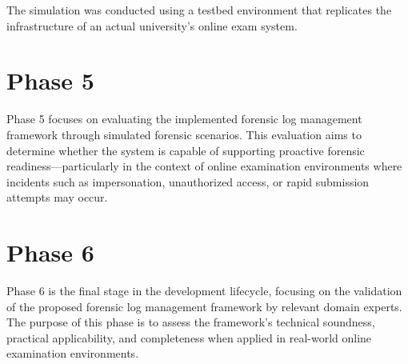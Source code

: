 The simulation was conducted using a testbed environment that replicates the infrastructure of an actual university's online exam system.
\section{Phase 5}
Phase 5 focuses on evaluating the implemented forensic log management framework through simulated forensic scenarios. This evaluation aims to determine whether the system is capable of supporting proactive forensic readiness—particularly in the context of online examination environments where incidents such as impersonation, unauthorized access, or rapid submission attempts may occur.

\section{Phase 6}
Phase 6 is the final stage in the development lifecycle, focusing on the validation of the proposed forensic log management framework by relevant domain experts. The purpose of this phase is to assess the framework’s technical soundness, practical applicability, and completeness when applied in real-world online examination environments.

